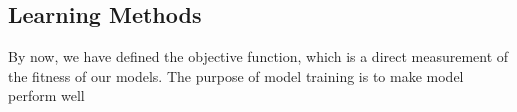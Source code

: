 \subsection {Learning Methods}
By now, we have defined the objective function, which is a direct measurement of the fitness of our models. The purpose of model training is to make model perform well